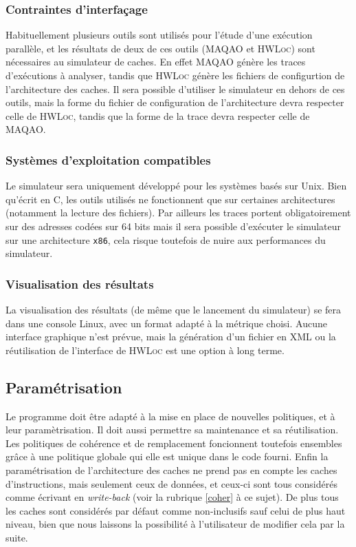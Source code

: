 \subsubsection{Contraintes d'interfaçage}

Habituellement plusieurs outils sont utilisés pour l'étude d'une exécution parallèle, et les résultats de deux de ces outils (\textsc{MAQAO} et \textsc{HWLoc}) sont nécessaires au simulateur de caches. En effet \textsc{MAQAO} génère les traces d'exécutions à analyser, tandis que \textsc{HWLoc}
génère les fichiers de configurtion de l'architecture des caches. Il sera possible d'utiliser le simulateur en dehors de ces outils, mais la forme du fichier de configuration de l'architecture devra respecter celle de \textsc{HWLoc}, tandis que la forme de la trace devra respecter celle de \textsc{MAQAO}.

\subsubsection{Systèmes d'exploitation compatibles}

Le simulateur sera uniquement développé pour les systèmes basés sur Unix. Bien qu'écrit en \textsc{C}, les outils utilisés ne fonctionnent que sur certaines architectures (notamment la lecture des fichiers). Par ailleurs les traces portent obligatoirement sur des adresses codées sur 64 bits mais il sera possible d'exécuter le simulateur sur une architecture \verb!x86!, cela risque toutefois de nuire aux performances du simulateur.

\subsubsection{Visualisation des résultats}

La visualisation des résultats (de même que le lancement du simulateur) se fera dans une console Linux, avec un format adapté à la métrique choisi. Aucune interface graphique n'est prévue, mais la génération d'un fichier en \textsc{XML} ou la réutilisation de l'interface de \textsc{HWLoc} est une option à long terme.

\subsection{Paramétrisation}

Le programme doit être adapté à la mise en place de nouvelles politiques, et à leur paramètrisation. Il doit aussi permettre sa maintenance et sa réutilisation. Les politiques de cohérence et de remplacement foncionnent toutefois ensembles grâce à une politique globale qui elle est unique dans le code fourni. Enfin la paramétrisation de l'architecture des caches ne prend pas en compte les caches d'instructions, mais seulement ceux de données, et ceux-ci sont tous considérés comme écrivant en \emph{write-back} (voir la rubrique \ref{coher} à ce sujet). De plus tous les caches sont considérés par défaut comme non-inclusifs sauf celui de plus haut niveau, bien que nous laissons la possibilité à l'utilisateur de modifier cela par la suite.

